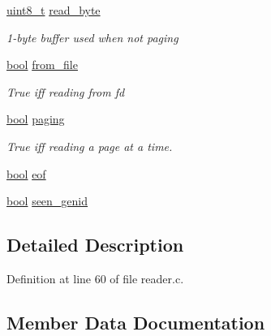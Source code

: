 \begin{DoxyCompactItemize}
\hyperlink{lib-src_2ffmpeg_2win32_2stdint_8h_a9a941819355e6f658991890ff66b4b0e}{uint8\+\_\+t} \hyperlink{struct_serd_reader_impl_ad1ca00cbb0da8030ee0213e281bc049b}{read\+\_\+byte}
\begin{DoxyCompactList}\small\item\em 1-\/byte \textquotesingle{}buffer\textquotesingle{} used when not paging \end{DoxyCompactList}\item 
\hyperlink{mac_2config_2i386_2lib-src_2libsoxr_2soxr-config_8h_abb452686968e48b67397da5f97445f5b}{bool} \hyperlink{struct_serd_reader_impl_a408331130f9cb0719dc74322cfad7ca9}{from\+\_\+file}
\begin{DoxyCompactList}\small\item\em True iff reading from {\ttfamily fd} \end{DoxyCompactList}\item 
\hyperlink{mac_2config_2i386_2lib-src_2libsoxr_2soxr-config_8h_abb452686968e48b67397da5f97445f5b}{bool} \hyperlink{struct_serd_reader_impl_adf71d0ad7ed396c0782d003499b7d3e2}{paging}
\begin{DoxyCompactList}\small\item\em True iff reading a page at a time. \end{DoxyCompactList}\item 
\hyperlink{mac_2config_2i386_2lib-src_2libsoxr_2soxr-config_8h_abb452686968e48b67397da5f97445f5b}{bool} \hyperlink{struct_serd_reader_impl_a0d6a7eb8e193703fe9788e0627e64f91}{eof}
\item 
\hyperlink{mac_2config_2i386_2lib-src_2libsoxr_2soxr-config_8h_abb452686968e48b67397da5f97445f5b}{bool} \hyperlink{struct_serd_reader_impl_a7d7280fc1b56b1ddcb6a309b7e206152}{seen\+\_\+genid}
\end{DoxyCompactItemize}


\subsection{Detailed Description}


Definition at line 60 of file reader.\+c.



\subsection{Member Data Documentation}
